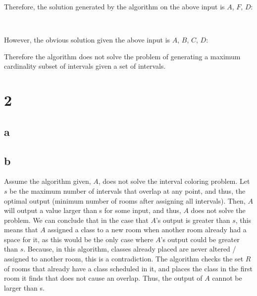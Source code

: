 \documentclass[letterpaper,notitlepage,twoside]{article}
\newcommand\tab[1][1cm]{\hspace*{#1}} %
\begin{document}
Therefore, the solution generated by the algorithm on the above input is $A$, $F$, $D$:
\begin{center}
\tab\tab{}
\\
\end{center}
However, the obvious solution given the above input is $A$, $B$, $C$, $D$:
\begin{center}
\end{center}
Therefore the algorithm does not solve the problem of generating a maximum cardinality subset of intervals given a set of intervals.

\section*{2}
\subsection*{a}
\subsection*{b}
Assume the algorithm given, $A$, does not solve the interval coloring problem. Let $s$ be the maximum number of intervals that overlap at any point, and thus, the optimal output (minimum number of rooms after assigning all intervals). Then, $A$ will output a value larger than s for some input, and thus, $A$ does not solve the problem. We can conclude that in the case that $A$'s output is greater than $s$, this means that $A$ assigned a class to a new room when another room already had a space for it, as this would be the only case where $A$'s output could be greater than $s$. Because, in this algorithm, classes already placed are never altered / assigned to another room, this is a contradiction. The algorithm checks the set $R$ of rooms that already have a class scheduled in it, and places the class in the first room it finds that does not cause an overlap. Thus, the output of $A$ cannot be larger than s. 
~\\ \par
\end{document}
